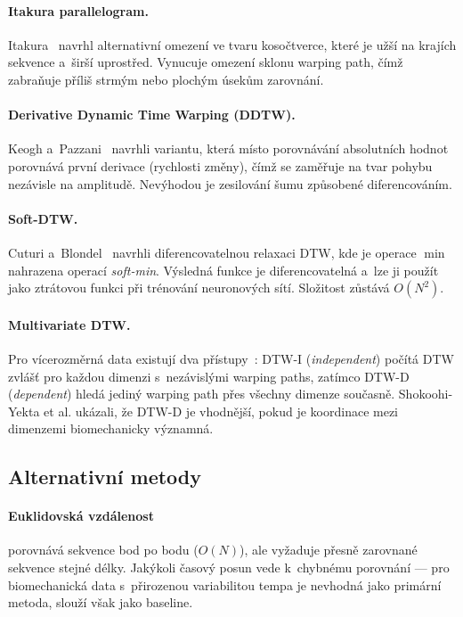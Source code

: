 \paragraph{Itakura parallelogram.}
Itakura~\cite{itakura1975} navrhl alternativní omezení ve tvaru kosočtverce, které je užší na krajích sekvence a~širší uprostřed. Vynucuje omezení sklonu warping path, čímž zabraňuje příliš strmým nebo plochým úsekům zarovnání.

\paragraph{Derivative Dynamic Time Warping (DDTW).}
Keogh a~Pazzani~\cite{keogh2001ddtw} navrhli variantu, která místo porovnávání absolutních hodnot porovnává první derivace (rychlosti změny), čímž se zaměřuje na tvar pohybu nezávisle na amplitudě. Nevýhodou je zesilování šumu způsobené diferencováním.

\paragraph{Soft-DTW.}
Cuturi a~Blondel~\cite{cuturi2017softdtw} navrhli diferencovatelnou relaxaci DTW, kde je operace $\min$ nahrazena operací \textit{soft-min}. Výsledná funkce je diferencovatelná a~lze ji použít jako ztrátovou funkci při trénování neuronových sítí. Složitost zůstává $O(N^2)$.

\paragraph{Multivariate DTW.}
Pro vícerozměrná data existují dva přístupy~\cite{shokoohi2017}: DTW-I (\textit{independent}) počítá DTW zvlášť pro každou dimenzi s~nezávislými warping paths, zatímco DTW-D (\textit{dependent}) hledá jediný warping path přes všechny dimenze současně. Shokoohi-Yekta et al. ukázali, že DTW-D je vhodnější, pokud je koordinace mezi dimenzemi biomechanicky významná.

\subsection{Alternativní metody}
\label{subsec:alternativni_metody}

\paragraph{Euklidovská vzdálenost} porovnává sekvence bod po bodu ($O(N)$), ale vyžaduje přesně zarovnané sekvence stejné délky. Jakýkoli časový posun vede k~chybnému porovnání --- pro biomechanická data s~přirozenou variabilitou tempa je nevhodná jako primární metoda, slouží však jako baseline.

